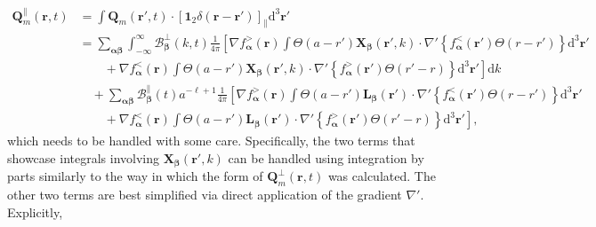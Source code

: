 \documentclass{article}
\begin{document}
\begin{equation}
\begin{split}
\mathbf{Q}_m^\parallel(\mathbf{r},t) &= \int\mathbf{Q}_m(\mathbf{r}',t)\cdot\left[\bm{1}_2\delta(\mathbf{r} - \mathbf{r}')\right]_\parallel\mathrm{d}^3\mathbf{r}'\\
&= \sum_{\bm{\alpha}\bm{\beta}}\int_{-\infty}^\infty \mathcal{B}_{\bm{\beta}}^\perp(k,t)\frac{1}{4\pi}\left[\nabla f_{\bm{\alpha}}^>(\mathbf{r})\int\Theta(a - r')\mathbf{X}_{\bm{\beta}}(\mathbf{r}',k)\cdot\nabla'\left\{f_{\bm{\alpha}}^<(\mathbf{r}')\Theta(r - r')\right\}\mathrm{d}^3\mathbf{r}'\right.\\
&\left.\qquad+ \nabla f_{\bm{\alpha}}^<(\mathbf{r})\int\Theta(a - r')\mathbf{X}_{\bm{\beta}}(\mathbf{r}',k)\cdot\nabla'\left\{f_{\bm{\alpha}}^>(\mathbf{r}')\Theta(r' - r)\right\}\mathrm{d}^3\mathbf{r}'\right]\mathrm{d}k\\
&\quad+ \sum_{\bm{\alpha}\bm{\beta}}\mathcal{B}_{\bm{\beta}}^\parallel(t)a^{-\ell + 1}\frac{1}{4\pi}\left[\nabla f_{\bm{\alpha}}^>(\mathbf{r})\int\Theta(a - r')\mathbf{L}_{\bm{\beta}}(\mathbf{r}')\cdot\nabla'\left\{f_{\bm{\alpha}}^<(\mathbf{r}')\Theta(r - r')\right\}\mathrm{d}^3\mathbf{r}'\right.\\
&\left.\qquad+ \nabla f_{\bm{\alpha}}^<(\mathbf{r})\int\Theta(a - r')\mathbf{L}_{\bm{\beta}}(\mathbf{r}')\cdot\nabla'\left\{f_{\bm{\alpha}}^>(\mathbf{r}')\Theta(r' - r)\right\}\mathrm{d}^3\mathbf{r}'\right],
\end{split}
\end{equation}
which needs to be handled with some care. Specifically, the two terms that showcase integrals involving $\mathbf{X}_{\bm{\beta}}(\mathbf{r}',k)$ can be handled using integration by parts similarly to the way in which the form of $\mathbf{Q}_m^\perp(\mathbf{r},t)$ was calculated. The other two terms are best simplified via direct application of the gradient $\nabla'$. Explicitly,
\end{document}
